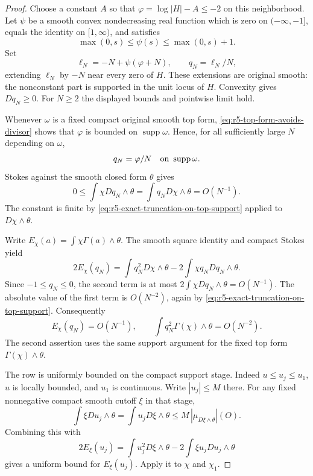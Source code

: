 \documentclass[11pt,a4paper]{article}
\numberwithin{equation}{section}
\theoremstyle{definition}
\theoremstyle{remark}
\begin{document}
\begin{proof}
Choose a constant $A$ so that
$\varphi=\log|H|-A\leq-2$ on this neighborhood.  Let $\psi$ be
a smooth convex nondecreasing real function which is zero on
$(-\infty,-1]$, equals the identity on $[1,\infty)$, and satisfies
\[
 \max(0,s)\leq\psi(s)\leq\max(0,s)+1.
\]
Set
\[
 \ell_N=-N+\psi(\varphi+N),\qquad q_N=\ell_N/N,
\]
extending $\ell_N$ by $-N$ near every zero of $H$.
These extensions are original smooth: the nonconstant part is
supported in the unit locus of $H$.  Convexity gives $Dq_N\geq0$.
For $N\geq2$ the displayed bounds and pointwise limit hold.

Whenever $\omega$ is a fixed compact original smooth top form,
\eqref{eq:r5-top-form-avoids-divisor} shows that $\varphi$ is
bounded on $\operatorname{supp}\omega$.  Hence, for all sufficiently
large $N$ depending on $\omega$,
\begin{equation}
 q_N=\varphi/N\quad\hbox{on }\operatorname{supp}\omega.
 \label{eq:r5-exact-truncation-on-top-support}
\end{equation}
Stokes against the smooth closed form $\theta$ gives
\[
 0\leq\int\chi Dq_N\wedge\theta
       =\int q_N D\chi\wedge\theta=O(N^{-1}).
\]
The constant is finite by
\eqref{eq:r5-exact-truncation-on-top-support} applied to
$D\chi\wedge\theta$.

Write $E_\chi(a)=\int\chi\Gamma(a)\wedge\theta$.
The smooth square identity and compact Stokes yield
\[
 2E_\chi(q_N)
  =\int q_N^2D\chi\wedge\theta
           -2\int\chi q_NDq_N\wedge\theta .
\]
Since $-1\leq q_N\leq0$, the second term is at most
$2\int\chi Dq_N\wedge\theta=O(N^{-1})$.
The absolute value of the first term is $O(N^{-2})$, again by
\eqref{eq:r5-exact-truncation-on-top-support}.  Consequently
\begin{equation}
 E_\chi(q_N)=O(N^{-1}),\qquad
 \int q_N^2\Gamma(\chi)\wedge\theta=O(N^{-2}).
 \label{eq:r5-log-cutoff-energies}
\end{equation}
The second assertion uses the same support argument for the fixed
top form $\Gamma(\chi)\wedge\theta$.

The row is uniformly bounded on the compact support stage.
Indeed $u\leq u_j\leq u_1$, $u$ is locally bounded, and $u_1$
is continuous.  Write $|u_j|\leq M$ there.  For any fixed
nonnegative compact smooth cutoff $\xi$ in that stage,
\[
 \int\xi Du_j\wedge\theta
       =\int u_j D\xi\wedge\theta
       \leq M\,|\mu_{D\xi\wedge\theta}|(O).
\]
Combining this with
\[
 2E_\xi(u_j)=\int u_j^2D\xi\wedge\theta
                    -2\int\xi u_jDu_j\wedge\theta
\]
gives a uniform bound for $E_\xi(u_j)$.  Apply it to $\chi$
and $\chi_1$.


\end{proof}
\end{document}
